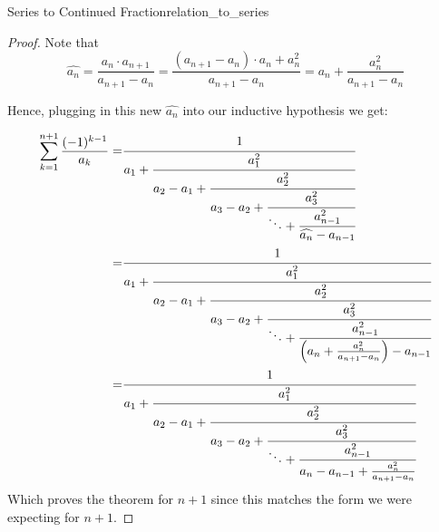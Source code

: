 \documentclass[a4paper]{article}
\begin{document}
\begin{mytheorem}{Series to Continued Fraction}{relation_to_series}
\begin{proof}
    Note that
    \begin{equation*}
      \widehat{a_n}
      =
      \frac{a_{n}\cdot a_{n+1}}{a_{n+1} - a_{n}} =
      \frac{(a_{n+1} - a_n)\cdot a_{n} + a_n^2}{a_{n+1} - a_{n}} = a_{n} + \frac{a_n^2}{a_{n+1} - a_{n}}
    \end{equation*}

    Hence, plugging in this new $\widehat{a_n}$ into our inductive hypothesis we get:

    \begin{align*}
      \sum_{k=1}^{n+1} \frac{(-1)^{k-1}}{a_k} = & \cfrac{1}{a_1+\cfrac{a_{1}^{2}}{a_2 - a_1 +\cfrac{a_2^2}{a_3 - a_2 +
            \cfrac{a_3^2}{\ddots + \cfrac{a_{n-1}^2}{\widehat{a_n} - a_{n-1}}}}}}
      \\
      =                                         & \cfrac{1}{a_1+\cfrac{a_{1}^{2}}{a_2 - a_1 +\cfrac{a_2^2}{a_3 - a_2 +
            \cfrac{a_3^2}{\ddots + \cfrac{a_{n-1}^2}{\Big( a_{n} + \frac{a_n^2}{a_{n+1} - a_{n}} \Big) - a_{n-1}}}}}}
      \\
      =                                         & \cfrac{1}{a_1+\cfrac{a_{1}^{2}}{a_2 - a_1 +\cfrac{a_2^2}{a_3 - a_2 +
            \cfrac{a_3^2}{\ddots + \cfrac{a_{n-1}^2}{a_{n} - a_{n-1} + \frac{a_n^2}{a_{n+1} - a_{n}} }}}}}
    \end{align*}
    Which proves the theorem for $n+1$ since this matches the form we were expecting for $n+1$.
  \end{proof}
\end{mytheorem}
\end{document}
